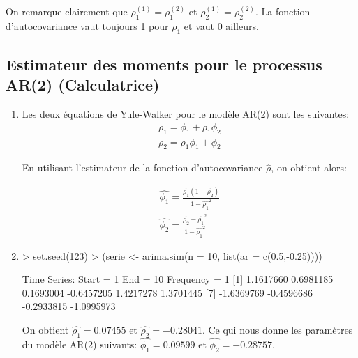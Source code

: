 \documentclass{article}
\begin{document}
On remarque clairement que $\rho_1^{(1)} = \rho_1^{(2)}$ et $\rho_2^{(1)} = \rho_2^{(2)}$. 
La fonction d'autocovariance vaut toujours 1 pour $\rho_1$ et vaut 0 ailleurs.

\clearpage
\subsection{Estimateur des moments pour le processus AR(2) (Calculatrice)}
\begin{enumerate}
\item 
Les deux équations de Yule-Walker pour le modèle AR(2) sont les suivantes:
\begin{align*}
\rho_1 = \phi_1 + \rho_1 \phi_2 \\
\rho_2 = \rho_1\phi_1 + \phi_2
\end{align*}

En utilisant l'estimateur de la fonction d'autocovariance $\hat{\rho}$, on obtient alors:

\begin{align*}
\hat{\phi_1} = \frac{\hat{\rho_1}(1-\hat{\rho_2})}{1-\hat{\rho_1}^2} \\
\hat{\phi_2} = \frac{\hat{\rho_2} - \hat{\rho_1}^2}{1-\hat{\rho_1}^2}
\end{align*}


\item

\begin{Schunk}
\begin{Sinput}
> set.seed(123)
> (serie <- arima.sim(n = 10, list(ar = c(0.5,-0.25))))
\end{Sinput}
\begin{Soutput}
Time Series:
Start = 1 
End = 10 
Frequency = 1 
 [1]  1.1617660  0.6981185  0.1693004 -0.6457205  1.4217278  1.3701445
 [7] -1.6369769 -0.4596686 -0.2933815 -1.0995973
\end{Soutput}
\end{Schunk}

On obtient $ = 0.07455$ et $ = -0.28041$. 
Ce qui nous donne les paramètres du modèle AR(2) suivants:
$ = 0.09599$ et 
$ = -0.28757$.
\end{enumerate}
\end{document}
